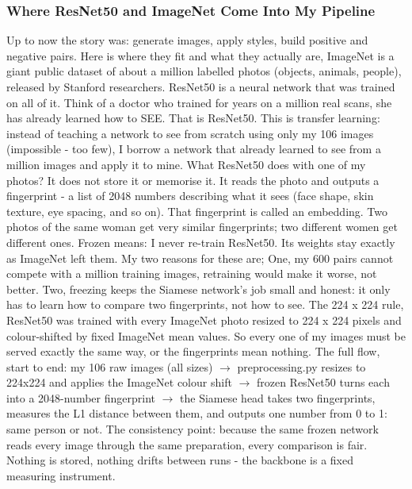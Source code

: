 \documentclass[conference]{IEEEtran}
\begin{document}
\subsubsection{Where ResNet50 and ImageNet Come Into My Pipeline}
Up to now the story was: generate images, apply styles, build positive and negative pairs. Here is where they fit and what they actually are, ImageNet is a giant public dataset of about a million labelled photos (objects, animals, people), released by Stanford researchers. ResNet50 is a neural network that was trained on all of it. Think of a doctor who trained for years on a million real scans, she has already learned how to SEE. That is ResNet50.
This is transfer learning: instead of teaching a network to see from scratch using only my 106 images (impossible - too few), I borrow a network that already learned to see from a million images and apply it to mine.
What ResNet50 does with one of my photos?
It does not store it or memorise it. It reads the photo and outputs a fingerprint - a list of 2048 numbers describing what it sees (face shape, skin texture, eye spacing, and so on). That fingerprint is called an embedding. Two photos of the same woman get very similar fingerprints; two different women get different ones.
Frozen means: I never re-train ResNet50. Its weights stay exactly as ImageNet left them. My
two reasons for these are; One, my 600 pairs cannot compete with a million training images, retraining would make it worse, not better. Two, freezing keeps the Siamese network's job small and honest: it only has to learn how to compare two fingerprints, not how to see.
The 224 x 224 rule, ResNet50 was trained with every ImageNet photo resized to 224 x 224 pixels and colour-shifted by fixed ImageNet mean values. So every one of my images must be served exactly the same way, or the fingerprints mean nothing.
The full flow, start to end: my 106 raw images (all sizes) $\rightarrow$ preprocessing.py resizes to 224x224 and applies the ImageNet colour shift $\rightarrow$ frozen ResNet50 turns each into a 2048-number fingerprint $\rightarrow$ the Siamese head takes two fingerprints, measures the L1 distance between them, and outputs one number from 0 to 1: same person or not.
The consistency point: because the same frozen network reads every image through the same preparation, every comparison is fair. Nothing is stored, nothing drifts between runs - the backbone is a fixed measuring instrument.
\end{document}
